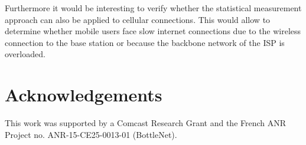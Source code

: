 \documentclass{sig-alternate-10pt}
\begin{document}
Furthermore it would be interesting to verify whether the statistical measurement approach can also be applied to cellular connections. This would allow to determine whether mobile users face slow internet connections due to the wireless connection to the base station or because the backbone network of the ISP is overloaded. 

\section{Acknowledgements}

This work was supported by a Comcast Research Grant and the French ANR Project no. ANR-15-CE25-0013-01 (BottleNet).





\end{document}
